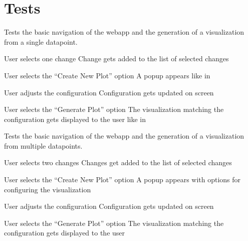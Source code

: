 \section{Tests}


Tests the basic navigation of the webapp and the generation of a \gls{visualization} from a single datapoint.

{User selects one change}
{Change gets added to the list of selected changes}

{User selects the \enquote{Create New Plot} option}
{A popup appears like in }

{User adjusts the configuration}
{Configuration gets updated on screen}

{User selects the \enquote{Generate Plot} option}
{The \gls{visualization} matching the configuration gets displayed to the user like in }


Tests the basic navigation of the webapp and the generation of a \gls{visualization} from multiple datapoints.

{User selects two changes}
{Changes get added to the list of selected changes}

{User selects the \enquote{Create New Plot} option}
{A popup appears with options for configuring the \gls{visualization}}

{User adjusts the configuration}
{Configuration gets updated on screen}

{User selects the \enquote{Generate Plot} option}
{The \gls{visualization} matching the configuration gets displayed to the user}


